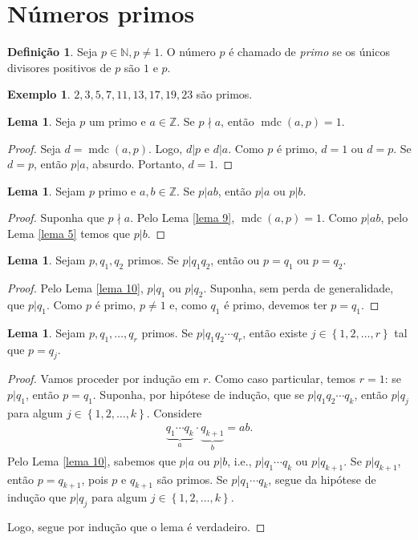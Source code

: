 \documentclass[a4paper,11pt,twoside, leqno]{article}
\DeclareMathOperator{\mdc}{mdc}
\theoremstyle{definition}
\newtheorem*{definition}{Definição}
\newtheorem{lemma}[theorem]{Lema}
\newtheorem*{example}{Exemplo}
\begin{document}
\section{Números primos}
\hspace{12pt} \begin{definition}
	Seja $p\in\mathbb{N}, p\neq 1$. O número $p$ é chamado de {\em primo} se os únicos divisores positivos de $p$ são $1$ e $p$.
\end{definition}
\begin{example}
	$2, 3, 5, 7, 11, 13, 17, 19, 23$ são primos.
\end{example}
\begin{lemma}
	\label{lema 9}
	Seja $p$ um primo e $a\in\mathbb{Z}$. Se $p\nmid a$, então $\mdc(a,p) = 1$.
\end{lemma}
\begin{proof}
	Seja $d = \mdc(a,p)$. Logo, $d|p$ e $d|a$. Como $p$ é primo, $d = 1$ ou $d = p$. Se $d=p$, então $p|a$, absurdo. Portanto, $d = 1$.
\end{proof}
\begin{lemma}
	\label{lema 10}
	Sejam $p$ primo e $a,b\in\mathbb{Z}$. Se $p|ab$, então $p|a$ ou $p|b$.
\end{lemma}
\begin{proof}
	Suponha que $p\nmid a$. Pelo Lema \eqref{lema 9}, $\mdc(a,p) = 1$. Como $p|ab$, pelo Lema \eqref{lema 5} temos que $p|b$.
\end{proof}
\begin{lemma}
	\label{lema 11}
	Sejam $p, q_1, q_2$ primos. Se $p|q_1q_2$, então ou $p = q_1$ ou $p=q_2$.
\end{lemma}
\begin{proof}
	Pelo Lema \eqref{lema 10}, $p|q_1$ ou $p|q_2$. Suponha, sem perda de generalidade, que $p|q_1$. Como $p$ é primo, $p\neq 1$ e, como $q_1$ é primo, devemos ter $p=q_1$.
\end{proof}
\begin{lemma}
	\label{lema 12}
	Sejam $p, q_1, \dots, q_r$ primos. Se $p|q_1q_2\cdots q_r$, então existe $j\in\left\{ 1, 2, \dots, r \right\}$ tal que $p = q_j$.
\end{lemma}
\begin{proof}
	Vamos proceder por indução em $r$. Como caso particular, temos $r=1$: se $p|q_1$, então $p=q_1$. Suponha, por hipótese de indução, que se $p|q_1q_2\cdots q_k$, então $p|q_j$ para algum $j\in\left\{1, 2, \dots, k \right\}$. Considere 
	\begin{align*}
	\underbrace{q_1\cdots q_k}_{a}\cdot \underbrace{q_{k+1}}_{b} = ab.
	\end{align*}
	Pelo Lema \eqref{lema 10}, sabemos que $p|a$ ou $p|b$, i.e., $p|q_1\cdots q_k$ ou $p|q_{k+1}$. Se $p|q_{k+1}$, então $p = q_{k+1}$, pois $p$ e $q_{k+1}$ são primos. Se $p|q_1\cdots q_k$, segue da hipótese de indução que $p|q_j$ para algum $j\in\left\{1, 2, \dots, k \right\}$.
	
	Logo, segue por indução que o lema é verdadeiro.
\end{proof}
\end{document}
